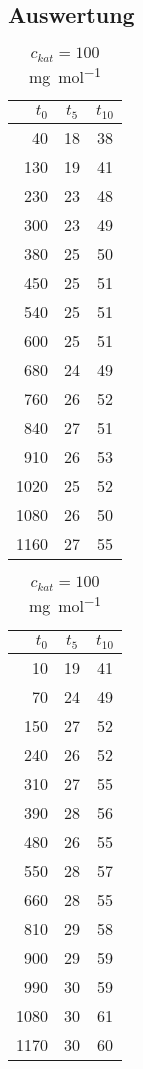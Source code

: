\documentclass{article}
\begin{document}
\begin{onehalfspace}
\section{Auswertung}

\begin{table}[!htbp]
\parbox{.45\linewidth}{
\centering

\begin{tabular}{rcc}
\hline
 $t_0$ & $t_5$  & $t_{10}$ \\
\hline
40 & 18 & 38 \\
130 & 19 & 41 \\
230 & 23 & 48 \\
300 & 23 & 49 \\
380 & 25 & 50 \\
450 & 25 & 51 \\
540 & 25 & 51 \\
600 & 25 & 51 \\
680 & 24 & 49 \\
760 & 26 & 52 \\
840 & 27 & 51 \\
910 & 26 & 53 \\
1020 & 25 & 52 \\
1080 & 26 & 50 \\
1160 & 27 & 55 \\
\hline
\end{tabular}
\caption{$c_{kat} = 200$ \si{\milli\gram\per\mol}}
}
\hfill
\parbox{.45\linewidth}{
\centering
\begin{tabular}{rcc}
\hline
 $t_0$ & $t_5$  & $t_{10}$ \\
\hline
10 & 19 & 41 \\
70 & 24 & 49 \\
150 & 27 & 52 \\
240 & 26 & 52 \\
310 & 27 & 55 \\
390 & 28 & 56 \\
480 & 26 & 55 \\
550 & 28 & 57 \\
660 & 28 & 55 \\
810 & 29 & 58 \\
900 & 29 & 59 \\
990 & 30 & 59 \\
1080 & 30 & 61  \\
1170 & 30 & 60 \\
\hline
\end{tabular}
\caption{$c_{kat} = 100$ \si{\milli\gram\per\mol}}
}
\end{table}



\end{onehalfspace}
\end{document}
